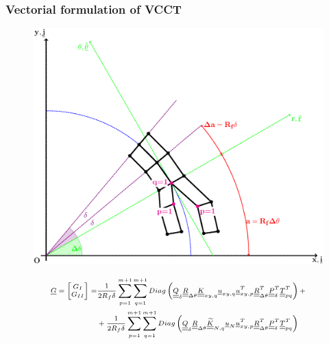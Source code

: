 \documentclass[first,firstsupp,lastsupp,last,hyperref,table]{ETHclass}
\begin{document}
\addtocounter{framenumber}{-1}

\begin{frame}
\frametitle{\vspace{0.25cm}\small Vectorial formulation of VCCT}
\vspace{-.75cm}
\centering
\begin{figure}
\centering
\includegraphics[height=0.5\textheight]{VCCT-linear.pdf}
\end{figure}
\begin{equation*}
\scriptsize
\begin{split}
\underline{G}=\begin{bmatrix}
G_{I} \\
G_{II}
\end{bmatrix}=&\frac{1}{2R_{f}\delta}\sum_{p=1}^{m+1}\sum_{q=1}^{m+1}Diag\left(\underline{\underline{Q}}_{\delta}\underline{\underline{R}}_{\Delta\theta}\underline{\underline{K}}_{xy,q}\underline{u}_{xy,q}\underline{u}_{xy,p}^{T}\underline{\underline{R}}_{\Delta\theta}^{T}\underline{\underline{P}}_{\delta}^{T}\underline{\underline{T}}_{pq}^{T}\right)+\\
&+\frac{1}{2R_{f}\delta}\sum_{p=1}^{m+1}\sum_{q=1}^{m+1}Diag\left(\underline{\underline{Q}}_{\delta}\underline{\underline{R}}_{\Delta\theta}\underline{\underline{\widetilde{K}}}_{N,q}\underline{u}_{N}\underline{u}_{xy,p}^{T}\underline{\underline{R}}_{\Delta\theta}^{T}\underline{\underline{P}}_{\delta}^{T}\underline{\underline{T}}_{pq}^{T}\right)
\end{split}
\end{equation*}
\end{frame}
\end{document}
